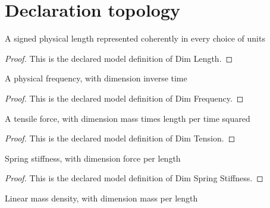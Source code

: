 \section{Declaration topology}
\begin{definition}
  \label{def:physics:phyx-mini-0180:phyxminiproblems-problemphyxmini0180-dimlength}
  A signed physical length represented coherently in every choice of units
\end{definition}
\begin{proof}
  This is the declared model definition of Dim Length.
\end{proof}
\begin{definition}
  \label{def:physics:phyx-mini-0180:phyxminiproblems-problemphyxmini0180-dimfrequency}
  A physical frequency, with dimension inverse time
\end{definition}
\begin{proof}
  This is the declared model definition of Dim Frequency.
\end{proof}
\begin{definition}
  \label{def:physics:phyx-mini-0180:phyxminiproblems-problemphyxmini0180-dimtension}
  A tensile force, with dimension mass times length per time squared
\end{definition}
\begin{proof}
  This is the declared model definition of Dim Tension.
\end{proof}
\begin{definition}
  \label{def:physics:phyx-mini-0180:phyxminiproblems-problemphyxmini0180-dimspringstiffness}
  Spring stiffness, with dimension force per length
\end{definition}
\begin{proof}
  This is the declared model definition of Dim Spring Stiffness.
\end{proof}
\begin{definition}
  \label{def:physics:phyx-mini-0180:phyxminiproblems-problemphyxmini0180-dimlinearmassdensity}
  Linear mass density, with dimension mass per length
\end{definition}

